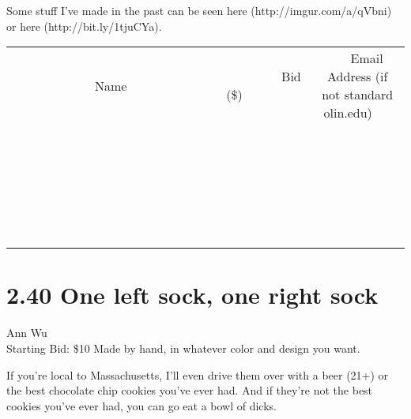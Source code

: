 \documentclass[11pt]{article}
\begin{document}
Some stuff I've made in the past can be seen here (http://imgur.com/a/qVbni) or here (http://bit.ly/1tjuCYa).
\\[6ex]
\begin{tabular}{c c c}
~~~~~~~~~~~~~Name~~~~~~~~~~~~~ & ~~~~~~~~~Bid (\$)~~~~~~~~~  & ~~~Email Address (if not standard olin.edu)~~~\\
 & & \\
\hline
 & & \\
\hline
 & & \\
\hline
 & & \\
\hline
 & & \\
\hline
 & & \\
\hline
 & & \\
\hline
 & & \\
\hline
 & & \\
\hline
 & & \\
\hline
 & & \\
\hline
 & & \\
\hline
 & & \\
\hline
 & & \\
\hline
 & & \\
\hline
 & & \\
\hline
 & & \\
\hline
 & & \\
\hline
 & & \\
\hline
 & & \\
\hline
 & & \\
\hline
 & & \\
\hline
 & & \\
\hline
 & & \\
\hline
 & & \\
\hline
 & & \\
\hline
\end{tabular}
\newpage
\section*{2.40 One left sock, one right sock}
Ann Wu
\\
Starting Bid: \$10
\newline
Made by hand, in whatever color and design you want.

If you're local to Massachusetts, I'll even drive them over with a beer (21+) or the best chocolate chip cookies you've ever had. And if they're not the best cookies you've ever had, you can go eat a bowl of dicks.
\end{document}
